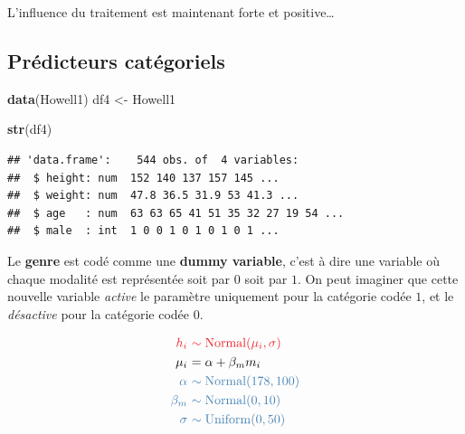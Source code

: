 \documentclass[
  a4paper,11pt,twoside,onecolumn,openright,final,oldfontcommands]{memoir}
\newenvironment{Shaded}{\begin{snugshade}}{\end{snugshade}}
\newcommand{\KeywordTok}[1]{\textcolor[rgb]{0.13,0.29,0.53}{\textbf{#1}}}
\newcommand{\NormalTok}[1]{#1}
\newcommand{\StringTok}[1]{\textcolor[rgb]{0.31,0.60,0.02}{#1}}
\theoremstyle{definition}
\theoremstyle{definition}
\theoremstyle{definition}
\theoremstyle{remark}
\begin{document}
L'influence du traitement est maintenant forte et positive\ldots{}

\hypertarget{pruxe9dicteurs-catuxe9goriels}{%
\subsection{Prédicteurs catégoriels}\label{pruxe9dicteurs-catuxe9goriels}}

\begin{Shaded}
\begin{Highlighting}[]
\KeywordTok{data}\NormalTok{(Howell1)}
\NormalTok{df4 \textless{}{-}}\StringTok{ }\NormalTok{Howell1}

\KeywordTok{str}\NormalTok{(df4)}
\end{Highlighting}
\end{Shaded}

\begin{verbatim}
## 'data.frame':    544 obs. of  4 variables:
##  $ height: num  152 140 137 157 145 ...
##  $ weight: num  47.8 36.5 31.9 53 41.3 ...
##  $ age   : num  63 63 65 41 51 35 32 27 19 54 ...
##  $ male  : int  1 0 0 1 0 1 0 1 0 1 ...
\end{verbatim}

Le \textbf{genre} est codé comme une \textbf{dummy variable}, c'est à dire une variable où chaque modalité est représentée soit par \(0\) soit par \(1\). On peut imaginer que cette nouvelle variable \emph{active} le paramètre uniquement pour la catégorie codée \(1\), et le \emph{désactive} pour la catégorie codée \(0\).

\[
\begin{aligned}
\color{orangered}{h_{i}} \ &\color{orangered}{\sim \mathrm{Normal}(\mu_{i}, \sigma)} \\
\color{black}{\mu_{i}} \ &\color{black}{= \alpha + \beta_{m}m_{i}} \\
\color{steelblue}{\alpha} \ &\color{steelblue}{\sim \mathrm{Normal}(178, 100)} \\
\color{steelblue}{\beta_{m}} \ &\color{steelblue}{\sim \mathrm{Normal}(0, 10)} \\
\color{steelblue}{\sigma} \ &\color{steelblue}{\sim \mathrm{Uniform}(0, 50)}
\end{aligned}
\]
\end{document}
